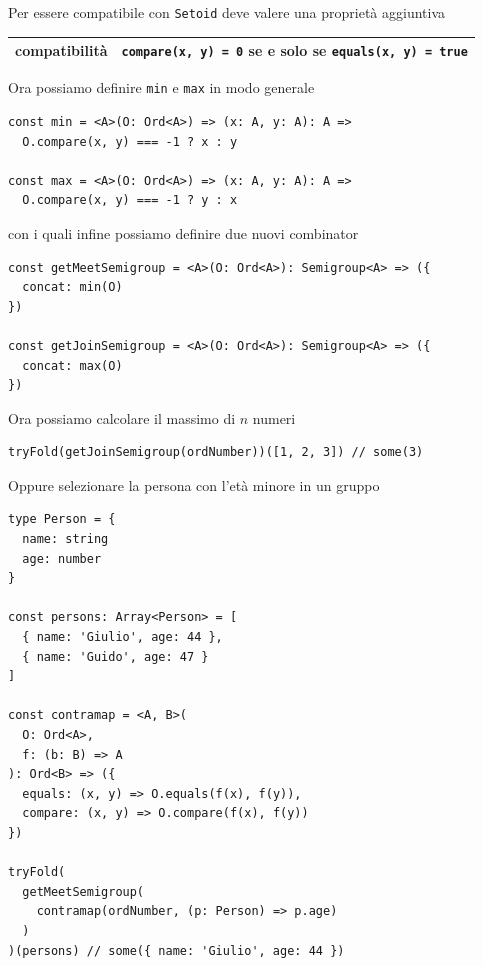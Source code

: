 \documentclass[12pt]{article}
\begin{document}
Per essere compatibile con \texttt{Setoid} deve valere una proprietà aggiuntiva

\begin{center}
\bgroup
\def\arraystretch{1.5}
\begin{tabular}{ |c|p{10cm}| }
\hline
compatibilità & \texttt{compare(x, y) = 0} se e solo se \texttt{equals(x, y) = true} \\
\hline
\end{tabular}
\egroup
\end{center}

Ora possiamo definire \texttt{min} e \texttt{max} in modo generale

\begin{verbatim}
const min = <A>(O: Ord<A>) => (x: A, y: A): A =>
  O.compare(x, y) === -1 ? x : y

const max = <A>(O: Ord<A>) => (x: A, y: A): A =>
  O.compare(x, y) === -1 ? y : x
\end{verbatim}

con i quali infine possiamo definire due nuovi combinator

\begin{verbatim}
const getMeetSemigroup = <A>(O: Ord<A>): Semigroup<A> => ({
  concat: min(O)
})

const getJoinSemigroup = <A>(O: Ord<A>): Semigroup<A> => ({
  concat: max(O)
})
\end{verbatim}

Ora possiamo calcolare il massimo di $n$ numeri

\begin{verbatim}
tryFold(getJoinSemigroup(ordNumber))([1, 2, 3]) // some(3)
\end{verbatim}

Oppure selezionare la persona con l'età minore in un gruppo

\begin{verbatim}
type Person = {
  name: string
  age: number
}

const persons: Array<Person> = [
  { name: 'Giulio', age: 44 },
  { name: 'Guido', age: 47 }
]

const contramap = <A, B>(
  O: Ord<A>,
  f: (b: B) => A
): Ord<B> => ({
  equals: (x, y) => O.equals(f(x), f(y)),
  compare: (x, y) => O.compare(f(x), f(y))
})

tryFold(
  getMeetSemigroup(
    contramap(ordNumber, (p: Person) => p.age)
  )
)(persons) // some({ name: 'Giulio', age: 44 })
\end{verbatim}
\end{document}
